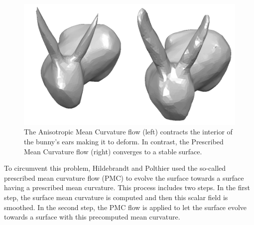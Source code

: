 \documentclass[11pt]{article}
\begin{document}
\begin{figure}[htbp]
\centering
\includegraphics[width=\textwidth]{amc_pmc.png}
\caption{The Anisotropic Mean Curvature flow (left) contracts the interior of the bunny's ears making it to deform. In contrast, the Prescribed Mean Curvature flow (right) converges to a stable surface.}
\label{fig:amc_pmc}
\end{figure}

To circumvent this problem, Hildebrandt and Polthier \cite{Hildebrandt04anisotropicfiltering} used the so-called prescribed mean curvature flow (PMC) to evolve the surface towards a surface having a prescribed mean curvature. This process includes two steps. In the first step, the surface mean curvature is computed and then this scalar field is smoothed. In the second step, the PMC flow is applied to let the surface evolve towards a surface with this precomputed mean curvature. 
\end{document}
